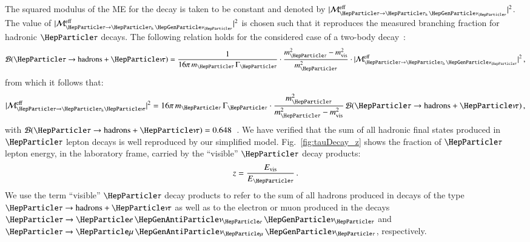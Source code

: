 The squared modulus of the ME for the decay is taken to be constant and denoted by $\vert\mathcal{M}^{\eff}_{\Pgt \to \tauhnu}\vert^{2}$.
The value of $\vert\mathcal{M}^{\eff}_{\Pgt \to \tauhnu}\vert^{2}$ is
chosen such that it reproduces the measured branching fraction for hadronic $\Pgt$ decays.
The following relation holds for the considered case of a two-body decay~\cite{Barger:1987nn}:
\begin{equation}
\mathcal{B}(\Pgt \to \textrm{hadrons} + \Pnut) = \frac{1}{16 \pi \, m_{\Pgt} \, \Gamma_{\Pgt}} \cdot \frac{m_{\Pgt}^{2} - m_{\vis}^{2}}{m_{\Pgt}^{2}} \cdot \vert \mathcal{M}^{\textrm{eff}}_{\Pgt \to
  \tauhnu} \vert^{2} \, ,
\end{equation}
from which it follows that:
\begin{equation}
\vert \mathcal{M}^{\textrm{eff}}_{\Pgt \to \tauh\Pnut} \vert^{2} = 16 \pi \, m_{\Pgt} \, \Gamma_{\Pgt} 
  \cdot \frac{m_{\Pgt}^{2}}{m_{\Pgt}^{2} - m_{\vis}^{2}} \, \mathcal{B}(\Pgt \to \textrm{hadrons} + \Pnut) \, , 
\end{equation}
with $\mathcal{B}(\Pgt \to \textrm{hadrons} + \Pnut) = 0.648$~\cite{PDG}.
We have verified that the sum of all hadronic final states produced in $\Pgt$ lepton decays
is well reproduced by our simplified model.
Fig.~\ref{fig:tauDecay_z} shows the fraction of $\Pgt$ lepton energy,
in the laboratory frame, carried by the ``visible'' $\Pgt$ decay
products:
\begin{equation}
z = \frac{E_{\vis}}{E_{\Pgt}} \, .
\label{eq:def_z}
\end{equation}
We use the term ``visible'' $\Pgt$ decay products to refer to the sum
of all hadrons produced in decays of the type $\Pgt \to \textrm{hadrons} + \Pnut$ 
as well as to the electron or muon produced in the decays $\Pgt \to \enunu$ and $\Pgt \to \mununu$, respectively.

